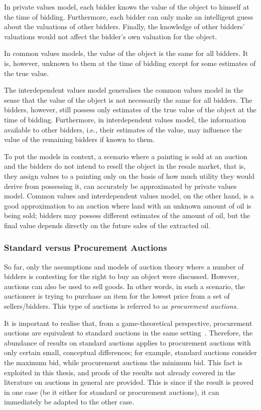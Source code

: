In private values model, each bidder knows the value of the object to himself at the time of bidding. Furthermore, each bidder can only make an intelligent guess about the valuations of other bidders. Finally, the knowledge of other bidders' valuations would not affect the bidder's own valuation for the object.

In common values models, the value of the object is the same for all bidders. It is, however, unknown to them at the time of bidding except for some estimates of the true value.

The interdependent values model generalises the common values model in the sense that the value of the object is not necessarily the same for all bidders. The bidders, however, still possess only estimates of the true value of the object at the time of bidding. Furthermore, in interdependent values model, the information available to other bidders, i.e., their estimates of the value, may influence the value of the remaining bidders if known to them.

To put the models in context, a scenario where a painting is sold at an auction and the bidders do not intend to resell the object in the resale market, that is, they assign values to a painting only on the basis of how much utility they would derive from possessing it, can accurately be approximated by private values model. Common values and interdependent values model, on the other hand, is a good approximation to an auction where land with an unknown amount of oil is being sold; bidders may possess different estimates of the amount of oil, but the final value depends directly on the future sales of the extracted oil.

\subsubsection{Standard versus Procurement Auctions} %
\label{ssub:standard_versus_procurement_auctions_dmp}
So far, only the assumptions and models of auction theory where a number of bidders is contesting for the right to buy an object were discussed. However, auctions can also be used to sell goods. In other words, in such a scenario, the auctioneer is trying to purchase an item for the lowest price from a set of sellers/bidders. This type of auctions is referred to as \emph{procurement auctions}.

It is important to realise that, from a game-theoretical perspective, procurement auctions are equivalent to standard auctions in the same setting~\cite{Krishna10}. Therefore, the abundance of results on standard auctions applies to procurement auctions with only certain small, conceptual differences; for example, standard auctions consider the maximum bid, while procurement auctions the minimum bid. This fact is exploited in this thesis, and proofs of the results not already covered in the literature on auctions in general are provided. This is since if the result is proved in one case (be it either for standard or procurement auctions), it can immediately be adapted to the other case.

